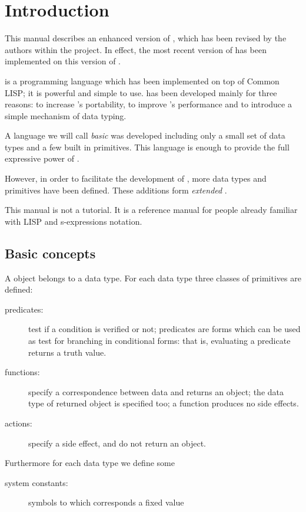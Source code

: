 \newpage
{}
\tableofcontents
\newpage
{}


\section{Introduction}

This manual describes an enhanced version of {\HG}, which has been revised by
the authors within the {\GF} project\cite{giunchiglia34,giunchiglia12,giunchiglia29}.
In effect, the most recent version of {\GF} has been implemented on this
version of {\HG}.

{\HG} is a programming language which has been implemented on top of Common
LISP; it is powerful and simple to use. {\HG} has been developed mainly for
three reasons: to increase {\GF}'s portability, to improve {\GF}'s performance
and to introduce a simple mechanism of data typing.

A language we will call {\it basic} {\HG} was developed including only a small
set of data types and a few built in primitives. This language is enough to
provide the full expressive power of {\HG}.

However, in order to facilitate the development of {\GF}, more data types and
primitives have been defined.
These additions form {\it extended} {\HG}.

This manual is not a tutorial.
It is a reference manual for people already familiar with LISP and
s-expressions notation.


\subsection{Basic concepts}

A {\HG} object belongs to a data type. For each data type three classes of
primitives are defined:

\begin{description}
    \item[predicates:]
        test if a condition is verified or not; predicates are forms which can
        be used as test for branching in conditional forms: that is, evaluating
		a predicate returns a truth value.
    \item[functions:]
        specify a correspondence between {\HG} data and returns an {\HG} object;
		the data type of returned object is specified too; a function produces
		no side effects.
    \item[actions:]
        specify a side effect, and do not return an {\HG} object.
\end{description}
%
\noindent
Furthermore for each data type we define some
%
\begin{description}
    \item[system constants:]
        symbols to which corresponds a fixed value
\end{description}


